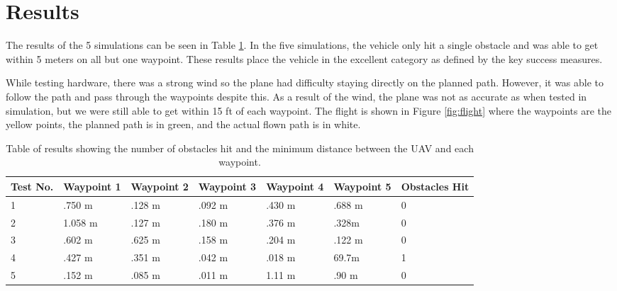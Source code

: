 \documentclass[]{auvsi_doc}
\begin{document}
\section*{Results}

The results of the 5 simulations can be seen in Table \ref{tab:results}. In the five simulations, the vehicle only hit a single obstacle and was able to get within 5 meters on all but one waypoint.
These results place the vehicle in the excellent category as defined by the key success measures.

While testing hardware, there was a strong wind so the plane had difficulty staying directly on the planned path. However, it was able to follow the path and pass through the waypoints despite this. As a result of the wind, the plane was not as accurate as when tested in simulation, but we were still able to get within 15 ft of each waypoint. The flight is shown in Figure \ref{fig:flight} where the waypoints are the yellow points, the planned path is in green, and the actual flown path is in white.

\begin{table}[h!]

\caption{Table of results showing the number of obstacles hit and the minimum distance between the UAV and each waypoint.}
\label{tab:results}
\begin{tabular} {|l|l|l|l|l|l|l|}
\hline
Test No. & Waypoint 1&Waypoint 2&Waypoint 3&Waypoint 4&Waypoint 5& Obstacles Hit\\
\hline
1 & .750 m& .128 m& .092 m& .430 m& .688 m & 0\\
2 & 1.058 m &.127 m & .180 m & .376 m & .328m & 0\\
3& .602 m& .625 m&.158 m& .204 m& .122 m& 0\\
4& .427 m & .351 m & .042 m & .018 m& 69.7m& 1\\
5& .152 m& .085 m& .011 m & 1.11 m & .90 m& 0\\
\hline
\end{tabular}
\end{table}
\end{document}
